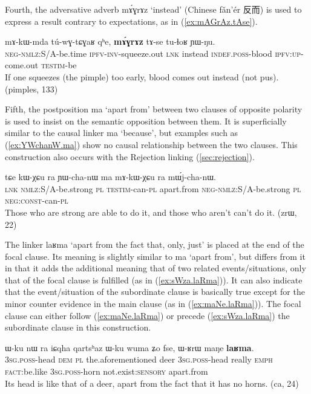 \documentclass[oldfontcommands,oneside,a4paper,11pt]{article}
\newcommand{\ipa}[1]{{\phon \mbox{#1}}} %
\newcommand{\zh}[1]{{\cn #1}}
\newcommand{\refb}[1]{(\ref{#1})}
\begin{document}
Fourth, the adversative adverb \ipa{mɤ́ɣrɤz} `instead' (Chinese \ipa{fǎn'ér} \zh{反而}) is used to express a result contrary to expectations, as in  \refb{ex:mAGrAz.tAse}.  

\begin{exe}
\ex \label{ex:mAGrAz.tAse}
\gll
 \ipa{mɤ-kɯ-mda}    	\ipa{tú-wɣ-tɕɣaʁ}    	\ipa{qʰe,}    	\ipa{\textbf{mɤ́ɣrɤz}}    	\ipa{tɤ-se}    	\ipa{tu-ɬoʁ}    	\ipa{ɲɯ-ŋu.}    \\
 \textsc{neg-nmlz:S/A}-be.time \textsc{ipfv-inv}-squeeze.out \textsc{lnk} instead \textsc{indef.poss}-blood \textsc{ipfv:up}-come.out \textsc{testim}-be  \\
\glt If one squeezes (the pimple) too early, blood comes out instead (not pus). (pimples, 133)
 \end{exe}
 

Fifth, the  postposition \ipa{ma} `apart from' between two clauses of opposite polarity is used to insist on the semantic opposition between them.  It is superficially similar to the causal linker \ipa{ma} `because', but   examples such as \refb{ex:YWchanW.ma} show no causal relationship between the two clauses. This construction  also occurs with the Rejection linking \refb{sec:rejection}.
\begin{exe}
\ex \label{ex:YWchanW.ma}
\gll
\ipa{tɕe}  	\ipa{kɯ-χɕu}  	\ipa{ra}  	\ipa{ɲɯ-cha-nɯ}  	\ipa{ma}  	\ipa{mɤ-kɯ-χɕu}  	\ipa{ra}  	\ipa{mɯ́j-cha-nɯ.}  \\
\textsc{lnk} \textsc{nmlz}:S/A-be.strong \textsc{pl} \textsc{testim}-can-\textsc{pl} apart.from \textsc{neg-nmlz}:S/A-be.strong \textsc{pl} \textsc{neg:const}-can-\textsc{pl} \\
\glt Those who are strong are able to do it, and those who aren't can't do it. (zrɯ, 22)
\end{exe}

The   linker  \ipa{laʁma} `apart from the fact that, only, just' is placed at the end of the focal clause. Its meaning is slightly similar to \ipa{ma} `apart from', but differs from it in that it adds the additional meaning that of two related events/situations, only that of the focal clause is fulfilled (as in \refb{ex:sWza.laRma}). It can also indicate that the event/situation of the subordinate clause is basically true except for the minor counter evidence in the main clause  (as in \refb{ex:maNe.laRma}).   The focal clause can either follow \refb{ex:maNe.laRma} or precede \refb{ex:sWza.laRma} the subordinate clause in this construction.
  \begin{exe}
\ex \label{ex:maNe.laRma}
\gll
\ipa{ɯ-ku}  	\ipa{nɯ} \ipa{ra}   	\ipa{iɕqha}  	\ipa{qartsʰaz}  	\ipa{ɯ-ku}  	\ipa{wuma}  	\ipa{ʑo}  	\ipa{fse,}  	\ipa{ɯ-ʁrɯ}  	\ipa{maŋe}  	\ipa{\textbf{laʁma}.}  	\\
\textsc{3sg.poss}-head \textsc{dem} \textsc{pl} the.aforementioned deer \textsc{3sg.poss}-head  really \textsc{emph} \textsc{fact}:be.like \textsc{3sg.poss}-horn not.exist:\textsc{sensory} apart.from \\
\glt Its head is like that of a deer, apart from the fact that it has no  horns. (ca, 24)
\end{exe} 
\end{document}
